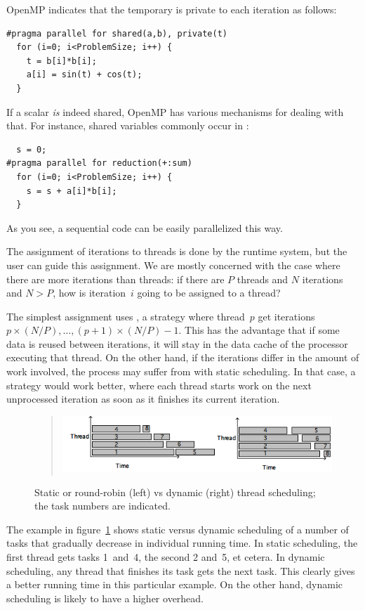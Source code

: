 OpenMP indicates that the temporary is private to each iteration as follows:
\begin{verbatim}
#pragma parallel for shared(a,b), private(t)
  for (i=0; i<ProblemSize; i++) {
    t = b[i]*b[i];
    a[i] = sin(t) + cos(t);
  }
\end{verbatim}
If a scalar \emph{is} indeed shared, OpenMP has various mechanisms for
dealing with that. For instance, shared variables commonly occur in
:
\begin{verbatim}
  s = 0;
#pragma parallel for reduction(+:sum)
  for (i=0; i<ProblemSize; i++) {
    s = s + a[i]*b[i];
  }
\end{verbatim}
As you see, a sequential code can be easily parallelized this way.

The assignment of iterations to threads is done by the runtime system,
but the user can guide this assignment. We are mostly concerned with
the case where there are more iterations than threads: if there are
$P$ threads and $N$ iterations and $N>P$, how is iteration~$i$ going
to be assigned to a thread?

The simplest assignment uses , a
 strategy where thread~$p$ get iterations
$p\times(N/P),\ldots,(p+1)\times (N/P)-1$.
This has the advantage that if some data is
reused between iterations, it will stay in the data cache of the
processor executing that thread. On the other hand, if the iterations
differ in the amount of work involved, the process may suffer from
 with static scheduling. In that case, a
 strategy would work better, where each
thread starts work on the next unprocessed iteration as soon as it
finishes its current iteration.
\begin{figure}
  \begin{quote}
  \includegraphics[scale=.7]{graphics-public/scheduling}
  \end{quote}
  \caption{Static or round-robin (left) vs dynamic (right) thread
    scheduling; the task numbers are indicated.}
  \label{fig:staticdynamic}
\end{figure}
The example in figure~\ref{fig:staticdynamic} shows static versus
dynamic scheduling of a number of tasks that gradually decrease in
individual running time. In static scheduling, the first thread gets
tasks 1~and~4, the second 2 and~5, et cetera. In dynamic scheduling,
any thread that finishes its task gets the next task. This clearly
gives a better running time in this particular example. On the other
hand, dynamic scheduling is likely to have a higher overhead.

